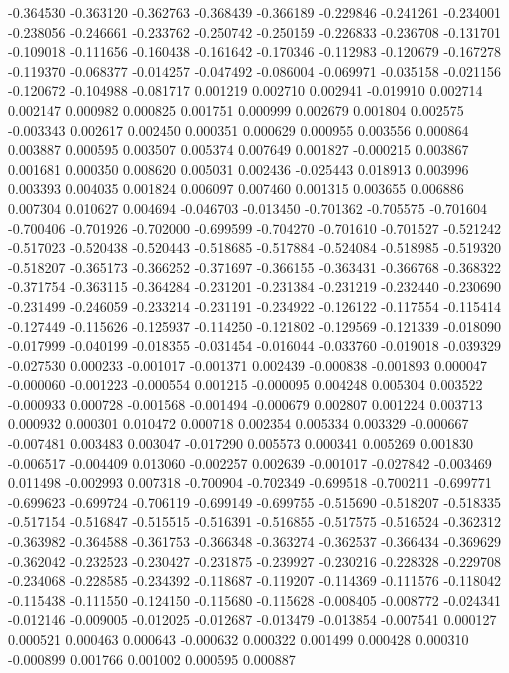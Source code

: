 -0.364530
-0.363120
-0.362763
-0.368439
-0.366189
-0.229846
-0.241261
-0.234001
-0.238056
-0.246661
-0.233762
-0.250742
-0.250159
-0.226833
-0.236708
-0.131701
-0.109018
-0.111656
-0.160438
-0.161642
-0.170346
-0.112983
-0.120679
-0.167278
-0.119370
-0.068377
-0.014257
-0.047492
-0.086004
-0.069971
-0.035158
-0.021156
-0.120672
-0.104988
-0.081717
0.001219
0.002710
0.002941
-0.019910
0.002714
0.002147
0.000982
0.000825
0.001751
0.000999
0.002679
0.001804
0.002575
-0.003343
0.002617
0.002450
0.000351
0.000629
0.000955
0.003556
0.000864
0.003887
0.000595
0.003507
0.005374
0.007649
0.001827
-0.000215
0.003867
0.001681
0.000350
0.008620
0.005031
0.002436
-0.025443
0.018913
0.003996
0.003393
0.004035
0.001824
0.006097
0.007460
0.001315
0.003655
0.006886
0.007304
0.010627
0.004694
-0.046703
-0.013450
-0.701362
-0.705575
-0.701604
-0.700406
-0.701926
-0.702000
-0.699599
-0.704270
-0.701610
-0.701527
-0.521242
-0.517023
-0.520438
-0.520443
-0.518685
-0.517884
-0.524084
-0.518985
-0.519320
-0.518207
-0.365173
-0.366252
-0.371697
-0.366155
-0.363431
-0.366768
-0.368322
-0.371754
-0.363115
-0.364284
-0.231201
-0.231384
-0.231219
-0.232440
-0.230690
-0.231499
-0.246059
-0.233214
-0.231191
-0.234922
-0.126122
-0.117554
-0.115414
-0.127449
-0.115626
-0.125937
-0.114250
-0.121802
-0.129569
-0.121339
-0.018090
-0.017999
-0.040199
-0.018355
-0.031454
-0.016044
-0.033760
-0.019018
-0.039329
-0.027530
0.000233
-0.001017
-0.001371
0.002439
-0.000838
-0.001893
0.000047
-0.000060
-0.001223
-0.000554
0.001215
-0.000095
0.004248
0.005304
0.003522
-0.000933
0.000728
-0.001568
-0.001494
-0.000679
0.002807
0.001224
0.003713
0.000932
0.000301
0.010472
0.000718
0.002354
0.005334
0.003329
-0.000667
-0.007481
0.003483
0.003047
-0.017290
0.005573
0.000341
0.005269
0.001830
-0.006517
-0.004409
0.013060
-0.002257
0.002639
-0.001017
-0.027842
-0.003469
0.011498
-0.002993
0.007318
-0.700904
-0.702349
-0.699518
-0.700211
-0.699771
-0.699623
-0.699724
-0.706119
-0.699149
-0.699755
-0.515690
-0.518207
-0.518335
-0.517154
-0.516847
-0.515515
-0.516391
-0.516855
-0.517575
-0.516524
-0.362312
-0.363982
-0.364588
-0.361753
-0.366348
-0.363274
-0.362537
-0.366434
-0.369629
-0.362042
-0.232523
-0.230427
-0.231875
-0.239927
-0.230216
-0.228328
-0.229708
-0.234068
-0.228585
-0.234392
-0.118687
-0.119207
-0.114369
-0.111576
-0.118042
-0.115438
-0.111550
-0.124150
-0.115680
-0.115628
-0.008405
-0.008772
-0.024341
-0.012146
-0.009005
-0.012025
-0.012687
-0.013479
-0.013854
-0.007541
0.000127
0.000521
0.000463
0.000643
-0.000632
0.000322
0.001499
0.000428
0.000310
-0.000899
0.001766
0.001002
0.000595
0.000887
